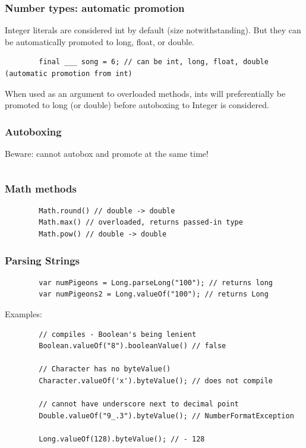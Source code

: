 \documentclass{scrartcl}
\begin{document}
\subsubsection{Number types: automatic promotion}

    Integer literals are considered int by default (size notwithstanding). But they can be automatically promoted to long, float, or double.

    \begin{lstlisting}
        final ___ song = 6; // can be int, long, float, double (automatic promotion from int)
    \end{lstlisting}

    When used as an argument to overloaded methods, ints will preferentially be promoted to long (or double) before autoboxing to Integer is considered.

\subsubsection{Autoboxing}

    Beware: cannot autobox and promote at the same time!

    \begin{lstlisting}

    \end{lstlisting}


\subsubsection{Math methods}
    \begin{lstlisting}
        Math.round() // double -> double
        Math.max() // overloaded, returns passed-in type
        Math.pow() // double -> double
    \end{lstlisting}

\subsubsection{Parsing Strings}
    \begin{lstlisting}
        var numPigeons = Long.parseLong("100"); // returns long
        var numPigeons2 = Long.valueOf("100"); // returns Long
    \end{lstlisting}

    Examples:
    \begin{lstlisting}
        // compiles - Boolean's being lenient
        Boolean.valueOf("8").booleanValue() // false

        // Character has no byteValue()
        Character.valueOf('x').byteValue(); // does not compile

        // cannot have underscore next to decimal point
        Double.valueOf("9_.3").byteValue(); // NumberFormatException

        Long.valueOf(128).byteValue(); // - 128
    \end{lstlisting}
\end{document}
